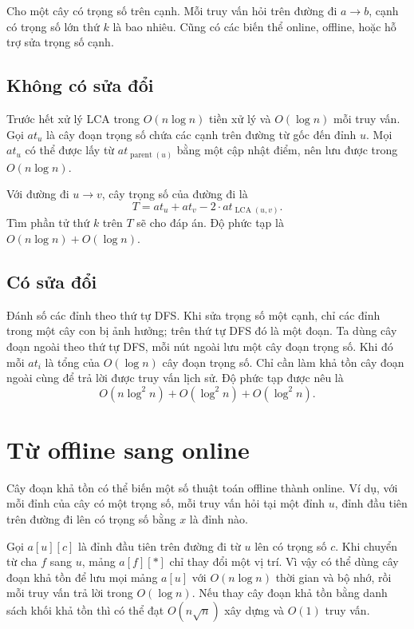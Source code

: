 \documentclass[11pt]{article}
\begin{document}
Cho một cây có trọng số trên cạnh. Mỗi truy vấn hỏi trên đường đi
$a\to b$, cạnh có trọng số lớn thứ $k$ là bao nhiêu. Cũng có các biến
thể online, offline, hoặc hỗ trợ sửa trọng số cạnh.

\subsection{Không có sửa đổi}

Trước hết xử lý LCA trong $O(n\log n)$ tiền xử lý và $O(\log n)$ mỗi
truy vấn. Gọi $at_u$ là cây đoạn trọng số chứa các cạnh trên đường từ
gốc đến đỉnh $u$. Mọi $at_u$ có thể được lấy từ $at_{\operatorname{parent}(u)}$
bằng một cập nhật điểm, nên lưu được trong $O(n\log n)$.

Với đường đi $u\to v$, cây trọng số của đường đi là
\[
  T=at_u+at_v-2\cdot at_{\operatorname{LCA}(u,v)} .
\]
Tìm phần tử thứ $k$ trên $T$ sẽ cho đáp án. Độ phức tạp là
$O(n\log n)+O(\log n)$.

\subsection{Có sửa đổi}

Đánh số các đỉnh theo thứ tự DFS. Khi sửa trọng số một cạnh, chỉ các
đỉnh trong một cây con bị ảnh hưởng; trên thứ tự DFS đó là một đoạn.
Ta dùng cây đoạn ngoài theo thứ tự DFS, mỗi nút ngoài lưu một cây đoạn
trọng số. Khi đó mỗi $at_i$ là tổng của $O(\log n)$ cây đoạn trọng số.
Chỉ cần làm khả tồn cây đoạn ngoài cùng để trả lời được truy vấn lịch
sử. Độ phức tạp được nêu là
\[
  O(n\log^2 n)+O(\log^2 n)+O(\log^2 n).
\]

\section{Từ offline sang online}

Cây đoạn khả tồn có thể biến một số thuật toán offline thành online.
Ví dụ, với mỗi đỉnh của cây có một trọng số, mỗi truy vấn hỏi tại một
đỉnh $u$, đỉnh đầu tiên trên đường đi lên có trọng số bằng $x$ là đỉnh
nào.

Gọi $a[u][c]$ là đỉnh đầu tiên trên đường đi từ $u$ lên có trọng số
$c$. Khi chuyển từ cha $f$ sang $u$, mảng $a[f][*]$ chỉ thay đổi một
vị trí. Vì vậy có thể dùng cây đoạn khả tồn để lưu mọi mảng $a[u]$ với
$O(n\log n)$ thời gian và bộ nhớ, rồi mỗi truy vấn trả lời trong
$O(\log n)$. Nếu thay cây đoạn khả tồn bằng danh sách khối khả tồn thì
có thể đạt $O(n\sqrt n)$ xây dựng và $O(1)$ truy vấn.
\end{document}

